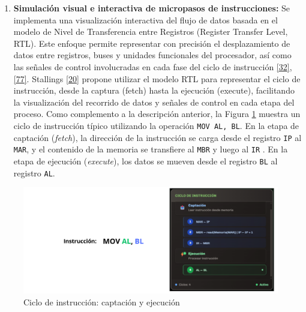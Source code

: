 \documentclass[12pt,oneside]{templates/unerthesis}
\providecommand{\tightlist}{%
  \setlength{\itemsep}{0pt}\setlength{\parskip}{0pt}}
\begin{document}
\begin{enumerate}
\def\labelenumi{\arabic{enumi}.}
\setcounter{enumi}{3}
\tightlist
\item
  \textbf{Simulación visual e interactiva de micropasos de instrucciones:}
  Se implementa una visualización interactiva del flujo de datos basada en el modelo de Nivel de Transferencia entre Registros (Register Transfer Level, RTL). Este enfoque permite representar con precisión el desplazamiento de datos entre registros, buses y unidades funcionales del procesador, así como las señales de control involucradas en cada fase del ciclo de instrucción \protect\hyperlink{ref-harris2015digital}{{[}32{]}}, \protect\hyperlink{ref-ASMVisualizer2025}{{[}77{]}}. Stallings \protect\hyperlink{ref-stallings_computer_2021}{{[}20{]}} propone utilizar el modelo RTL para representar el ciclo de instrucción, desde la captura (fetch) hasta la ejecución (execute), facilitando la visualización del recorrido de datos y señales de control en cada etapa del proceso.
  Como complemento a la descripción anterior, la Figura \ref{fig:cicloinstruccion} muestra un ciclo de instrucción típico utilizando la operación \texttt{MOV\ AL,\ BL}. En la etapa de captación (\emph{fetch}), la dirección de la instrucción se carga desde el registro \texttt{IP} al \texttt{MAR}, y el contenido de la memoria se transfiere al \texttt{MBR} y luego al \texttt{IR} . En la etapa de ejecución (\emph{execute}), los datos se mueven desde el registro \texttt{BL} al registro \texttt{AL}.
\end{enumerate}

\begin{figure}

{\centering \includegraphics[width=0.85\linewidth]{images/cicloinstruccion} 

}

\caption{Ciclo de instrucción: captación y ejecución}\label{fig:cicloinstruccion}
\end{figure}
\end{document}
